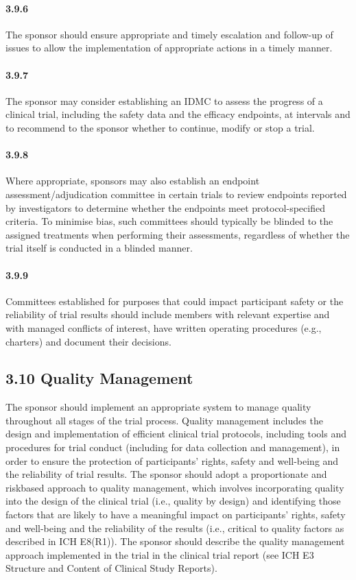 \documentclass[11pt]{article}
\begin{document}
\paragraph{3.9.6} The sponsor should ensure appropriate and timely escalation and follow-up of issues to allow the implementation of appropriate actions in a timely manner.

\paragraph{3.9.7} The sponsor may consider establishing an IDMC to assess the progress of a clinical trial, including the safety data and the efficacy endpoints, at intervals and to recommend to the sponsor whether to continue, modify or stop a trial.

\paragraph{3.9.8} Where appropriate, sponsors may also establish an endpoint assessment/adjudication committee in certain trials to review endpoints reported by investigators to determine whether the endpoints meet protocol-specified criteria. To minimise bias, such committees should typically be blinded to the assigned treatments when performing their assessments, regardless of whether the trial itself is conducted in a blinded manner.

\paragraph{3.9.9} Committees established for purposes that could impact participant safety or the reliability of trial results should include members with relevant expertise and with managed conflicts of interest, have written operating procedures (e.g., charters) and document their decisions.

\subsection{3.10 Quality Management}

The sponsor should implement an appropriate system to manage quality throughout all stages of the trial process. Quality management includes the design and implementation of efficient clinical trial protocols, including tools and procedures for trial conduct (including for data collection and management), in order to ensure the protection of participants' rights, safety and well-being and the reliability of trial results. The sponsor should adopt a proportionate and riskbased approach to quality management, which involves incorporating quality into the design of the clinical trial (i.e., quality by design) and identifying those factors that are likely to have a meaningful impact on participants' rights, safety and well-being and the reliability of the results (i.e., critical to quality factors as described in ICH E8(R1)). The sponsor should describe the quality management approach implemented in the trial in the clinical trial report (see ICH E3 Structure and Content of Clinical Study Reports).
\end{document}
